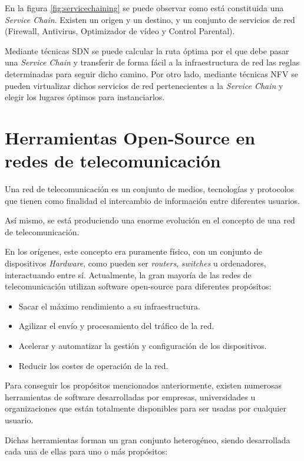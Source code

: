 En la figura \ref{fig:servicechaining} se puede observar como está constituida una \textit{Service Chain}. Existen un origen y un destino, y un conjunto de servicios de red (Firewall, Antivirus, Optimizador de vídeo y Control Parental).

Mediante técnicas \ac{SDN} se puede calcular la ruta óptima por el que debe pasar una \textit{Service Chain} y transferir de forma fácil a la infraestructura de red las reglas determinadas para seguir dicho camino. Por otro lado, mediante técnicas \ac{NFV} se pueden virtualizar dichos servicios de red pertenecientes a la \textit{Service Chain} y elegir los lugares óptimos para instanciarlos.


\section{Herramientas Open-Source en redes de telecomunicación}
\label{sec:opensourcenets}

Una red de telecomunicación es un conjunto de medios, tecnologías y protocolos que tienen como finalidad el intercambio de información entre diferentes usuarios.

Así mismo, se está produciendo una enorme evolución en el concepto de una red de telecomunicación. 

En los orígenes, este concepto era puramente físico, con un conjunto de dispositivos \textit{Hardware}, como pueden ser \textit{routers}, \textit{switches} u ordenadores, interactuando entre sí. Actualmente, la gran mayoría de las redes de telecomunicación utilizan software open-source para diferentes propósitos:

\begin{itemize}
	\item Sacar el máximo rendimiento a su infraestructura.
	\item Agilizar el envío y procesamiento del tráfico de la red.
	\item Acelerar y automatizar la gestión y configuración de los dispositivos.
	\item Reducir los costes de operación de la red.
\end{itemize}

Para conseguir los propósitos mencionados anteriormente, existen numerosas herramientas de software desarrolladas por empresas, universidades u organizaciones que están totalmente disponibles para ser usadas por cualquier usuario.

Dichas herramientas forman un gran conjunto heterogéneo, siendo desarrollada cada una de ellas para uno o más propósitos:

